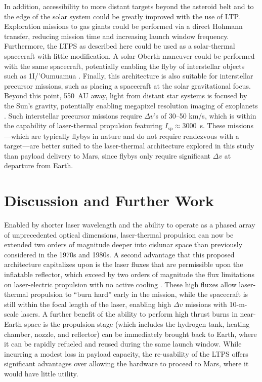 \documentclass[final,3p,times,twocolumn,sort&compress, lefttitle]{elsarticle}
\begin{document}
        
        In addition, accessibility to more distant targets beyond the asteroid belt and to the edge of the solar system could be greatly improved with the use of LTP. Exploration missions to gas giants could be performed via a direct Hohmann transfer, reducing mission time and increasing launch window frequency. Furthermore, the LTPS as described here could be used as a solar-thermal spacecraft with little modification. A solar Oberth maneuver could be performed with the same spacecraft, potentially enabling the flyby of interstellar objects such as 1I/’Oumuamua \cite{hein_project_2019, hein_interstellar_2021}. Finally, this architecture is also suitable for interstellar precursor missions, such as placing a spacecraft at the solar gravitational focus. Beyond this point, 550~AU away, light from distant star systems is focused by the Sun's gravity, potentially enabling megapixel resolution imaging of exoplanets \cite{turyshev_direct_2020}. Such interstellar precursor missions require $\Delta v$'s of 30--50 km/s, which is within the capability of laser-thermal propulsion featuring $I_\mathrm{sp} \approx 3000$~s. These missions—which are typically flybys in nature and do not require rendezvous with a target—are better suited to the laser-thermal architecture explored in this study than payload delivery to Mars, since flybys only require significant $\Delta v$ at departure from Earth.

    \section{Discussion and Further Work}
        Enabled by shorter laser wavelength and the ability to operate as a phased array of unprecedented optical dimensions, laser-thermal propulsion can now be extended two orders of magnitude deeper into cislunar space than previously considered in the 1970s and 1980s. A second advantage that this proposed architecture capitalizes upon is the laser fluxes that are permissible upon the inflatable reflector, which exceed by two orders of magnitude the flux limitations on laser-electric propulsion with no active cooling \cite{sheerin_fast_2021,brophy_directed-energy_2019}. These high fluxes allow laser-thermal propulsion to “burn hard” early in the mission, while the spacecraft is still within the focal length of the laser, enabling high $\Delta v$ missions with 10-m-scale lasers. A further benefit of the ability to perform high thrust burns in near-Earth space is the propulsion stage (which includes the hydrogen tank, heating chamber, nozzle, and reflector) can be immediately brought back to Earth, where it can be rapidly refueled and reused during the same launch window. While incurring a modest loss in payload  capacity, the re-usability of the LTPS offers significant advantages over allowing the hardware to proceed to Mars, where it would have little utility.
\end{document}
